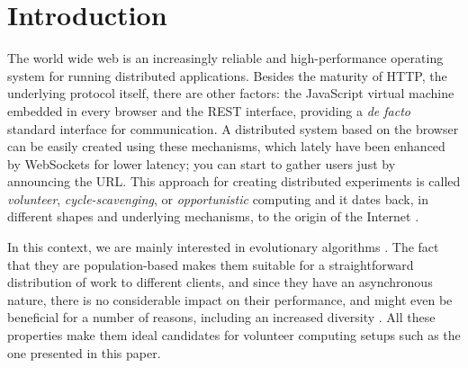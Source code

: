 \documentclass{llncs}
\begin{document}
\section{Introduction}
The world wide web is an increasingly reliable and high-performance
operating system for running distributed applications. Besides the
maturity of HTTP, the underlying protocol itself, there are other
factors: the JavaScript virtual machine embedded in every browser
and the REST interface, providing a {\em de facto} standard interface for
communication. A distributed system based on the browser can be
easily created using these mechanisms, which lately have been enhanced
by WebSockets for lower latency; you can start to gather users just by
announcing the URL. This approach for creating distributed
experiments is called {\em volunteer}, {\em cycle-scavenging},
or {\em opportunistic} computing
\cite{sarmenta2001volunteer} and it dates back, in different shapes
and underlying mechanisms, to the origin of the Internet
\cite{david-seti:home}.

In this context, we are mainly interested in evolutionary algorithms
\cite{milani2004online,sherry2012flex,jj-ppsn98}%
. The fact that they are population-based makes them suitable for a
straightforward distribution of work to different clients, and since
they have an asynchronous nature, there is no considerable impact on
their performance, and might even be beneficial for a number of
reasons, including an increased diversity
\cite{cantu-paz:migration-policies}. All these properties make them
ideal candidates for volunteer computing setups such as the one
presented in this paper.
\end{document}
